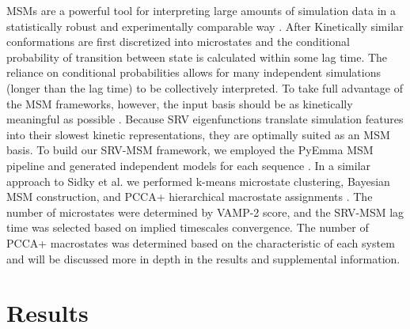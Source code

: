 \documentclass[journal=jpcbfk,manuscript=article]{achemso}
\begin{document}
MSMs are a powerful tool for interpreting large amounts of simulation data in a statistically robust and experimentally comparable way \citep{Phys2011MarkovValidation, Husic2018MarkovScience}. After Kinetically similar conformations are first discretized into microstates and the conditional probability of transition between state is calculated within some lag time. The reliance on conditional probabilities allows for many independent simulations (longer than the lag time) to be collectively interpreted. To take full advantage of the MSM frameworks, however, the input basis should be as kinetically meaningful as possible \citep{Pande2010EverythingAsk}. Because SRV eigenfunctions translate simulation features into their slowest kinetic representations, they are optimally suited as an MSM basis. To build our SRV-MSM framework, we employed the PyEmma MSM pipeline and generated independent models for each sequence \citep{Scherer2015PyEMMAModels}. In a similar approach to Sidky et al. we performed k-means microstate clustering, Bayesian MSM construction, and PCCA+ hierarchical macrostate assignments \citep{Sidky}. The number of microstates were determined by VAMP-2 score, and the SRV-MSM lag time was selected based on implied timescales convergence.  The number of PCCA+ macrostates was determined based on the characteristic of each system and will be discussed more in depth in the results and supplemental information.






\section{\label{sec:Results}Results}
\end{document}
